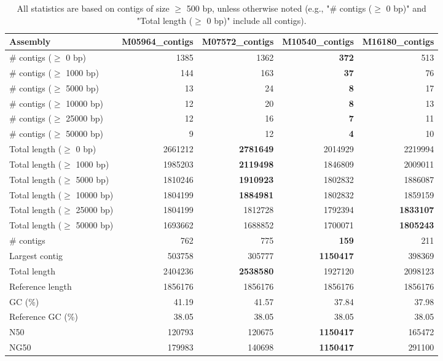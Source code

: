 \documentclass[12pt,a4paper]{article}
\begin{document}
\begin{table}[ht]
\begin{center}
\caption{All statistics are based on contigs of size $\geq$ 500 bp, unless otherwise noted (e.g., "\# contigs ($\geq$ 0 bp)" and "Total length ($\geq$ 0 bp)" include all contigs).}
\begin{tabular}{|l*{4}{|r}|}
\hline
Assembly & M05964\_contigs & M07572\_contigs & M10540\_contigs & M16180\_contigs \\ \hline
\# contigs ($\geq$ 0 bp) & 1385 & 1362 & {\bf 372} & 513 \\ \hline
\# contigs ($\geq$ 1000 bp) & 144 & 163 & {\bf 37} & 76 \\ \hline
\# contigs ($\geq$ 5000 bp) & 13 & 24 & {\bf 8} & 17 \\ \hline
\# contigs ($\geq$ 10000 bp) & 12 & 20 & {\bf 8} & 13 \\ \hline
\# contigs ($\geq$ 25000 bp) & 12 & 16 & {\bf 7} & 11 \\ \hline
\# contigs ($\geq$ 50000 bp) & 9 & 12 & {\bf 4} & 10 \\ \hline
Total length ($\geq$ 0 bp) & 2661212 & {\bf 2781649} & 2014929 & 2219994 \\ \hline
Total length ($\geq$ 1000 bp) & 1985203 & {\bf 2119498} & 1846809 & 2009011 \\ \hline
Total length ($\geq$ 5000 bp) & 1810246 & {\bf 1910923} & 1802832 & 1886087 \\ \hline
Total length ($\geq$ 10000 bp) & 1804199 & {\bf 1884981} & 1802832 & 1859159 \\ \hline
Total length ($\geq$ 25000 bp) & 1804199 & 1812728 & 1792394 & {\bf 1833107} \\ \hline
Total length ($\geq$ 50000 bp) & 1693662 & 1688852 & 1700071 & {\bf 1805243} \\ \hline
\# contigs & 762 & 775 & {\bf 159} & 211 \\ \hline
Largest contig & 503758 & 305777 & {\bf 1150417} & 398369 \\ \hline
Total length & 2404236 & {\bf 2538580} & 1927120 & 2098123 \\ \hline
Reference length & 1856176 & 1856176 & 1856176 & 1856176 \\ \hline
GC (\%) & 41.19 & 41.57 & 37.84 & 37.98 \\ \hline
Reference GC (\%) & 38.05 & 38.05 & 38.05 & 38.05 \\ \hline
N50 & 120793 & 120675 & {\bf 1150417} & 165472 \\ \hline
NG50 & 179983 & 140698 & {\bf 1150417} & 291100 \\ \hline

\end{tabular}
\end{center}
\end{table}
\end{document}

